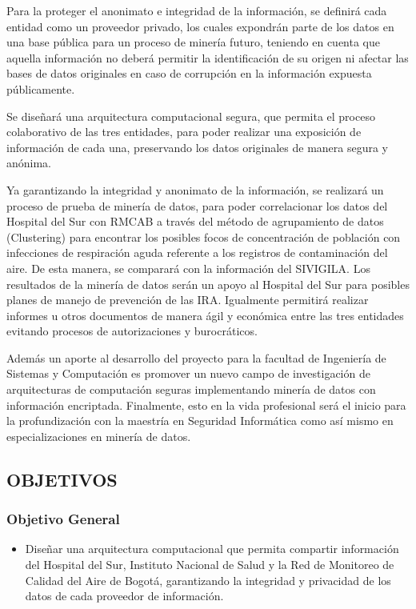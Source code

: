 \documentclass[a4paper, 12pt, oneside]{article}
\theoremstyle{definition}
\theoremstyle{remark}
\begin{document}
Para la proteger el anonimato e integridad de la información, se definirá cada entidad como un proveedor privado, los cuales expondrán parte de los datos en una base pública para un proceso de minería futuro, teniendo en cuenta que aquella información no deberá permitir la identificación de su origen ni afectar las bases de datos originales en caso de corrupción en la información expuesta públicamente.

Se diseñará una arquitectura computacional segura, que permita el proceso colaborativo de las tres entidades, para poder realizar una exposición de información de cada una, preservando los datos originales de manera segura y anónima.

Ya garantizando la integridad y anonimato de la información, se realizará un proceso de prueba de minería de datos, para poder correlacionar los datos del Hospital del Sur con RMCAB a través del método de agrupamiento de datos (Clustering) para encontrar los posibles focos de concentración de población con infecciones de respiración aguda referente a los registros de contaminación del aire. De esta manera, se comparará con la información del SIVIGILA. Los resultados de la minería de datos serán un apoyo  al Hospital del Sur para posibles planes de manejo de prevención de las IRA. Igualmente permitirá realizar informes u otros documentos de manera ágil y económica entre las tres entidades evitando procesos de autorizaciones y burocráticos.

Además un aporte al desarrollo del proyecto para la facultad de Ingeniería de Sistemas y Computación es promover un nuevo campo de investigación de arquitecturas de computación seguras implementando minería de datos con información encriptada. Finalmente, esto en la vida profesional será el inicio para la profundización con la maestría en Seguridad Informática como así mismo en especializaciones en minería de datos.

\subsection{OBJETIVOS}

\subsubsection{Objetivo General}
\begin{itemize}
\item Diseñar una arquitectura computacional que permita compartir información del Hospital del Sur, Instituto Nacional de Salud y la Red de Monitoreo de Calidad del Aire de Bogotá, garantizando la integridad y privacidad de los datos de cada proveedor de información.
\end{itemize}
\end{document}

